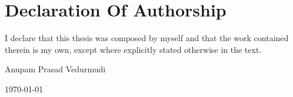 \chapter*{Declaration Of Authorship}

\noindent I declare that this thesis was composed by myself and that the work contained therein is  my own, except where explicitly stated otherwise in the text.

\vspace{\baselineskip}
\noindent Anupam Prasad Vedurmudi

\noindent\today
